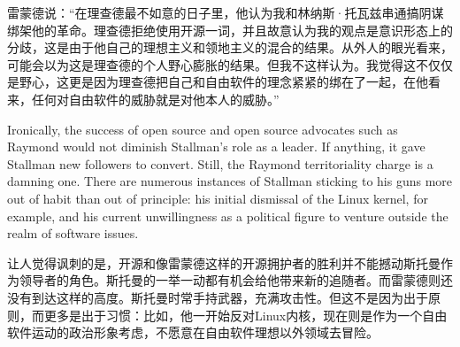 \ifdefined\chs
雷蒙德说：``在理查德最不如意的日子里，他认为我和林纳斯·托瓦兹串通搞阴谋绑架他的革命。理查德拒绝使用开源一词，并且故意认为我的观点是意识形态上的分歧，这是由于他自己的理想主义和领地主义的混合的结果。从外人的眼光看来，可能会以为这是理查德的个人野心膨胀的结果。但我不这样认为。我觉得这不仅仅是野心，这更是因为理查德把自己和自由软件的理念紧紧的绑在了一起，在他看来，任何对自由软件的威胁就是对他本人的威胁。''
\fi



\ifdefined\eng
Ironically, the success of open source and open source advocates such as Raymond would not diminish Stallman's role as a leader. If anything, it gave Stallman new followers to convert. Still, the Raymond territoriality charge is a damning one. There are numerous instances of Stallman sticking to his guns more out of habit than out of principle: his initial dismissal of the Linux kernel, for example, and his current unwillingness as a political figure to venture outside the realm of software issues.
\fi

\ifdefined\chs
让人觉得讽刺的是，开源和像雷蒙德这样的开源拥护者的胜利并不能撼动斯托曼作为领导者的角色。斯托曼的一举一动都有机会给他带来新的追随者。而雷蒙德则还没有到达这样的高度。斯托曼时常手持武器，充满攻击性。但这不是因为出于原则，而更多是出于习惯：比如，他一开始反对Linux内核，现在则是作为一个自由软件运动的政治形象考虑，不愿意在自由软件理想以外领域去冒险。
\fi

